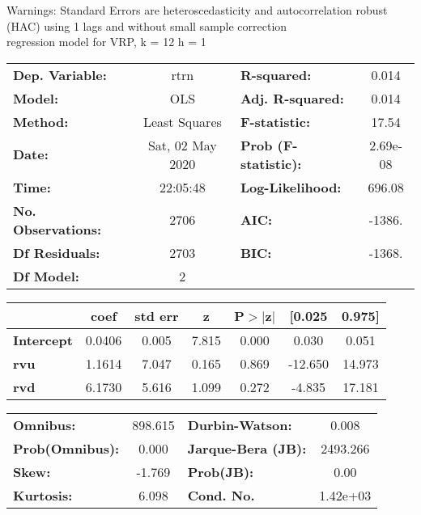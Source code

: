 Warnings: \newline
 [1] Standard Errors are heteroscedasticity and autocorrelation robust (HAC) using 1 lags and without small sample correction\\ 

regression model for VRP, k = 12 h = 1\begin{center}
\begin{tabular}{lclc}
\toprule
\textbf{Dep. Variable:}    &       rtrn       & \textbf{  R-squared:         } &     0.014   \\
\textbf{Model:}            &       OLS        & \textbf{  Adj. R-squared:    } &     0.014   \\
\textbf{Method:}           &  Least Squares   & \textbf{  F-statistic:       } &     17.54   \\
\textbf{Date:}             & Sat, 02 May 2020 & \textbf{  Prob (F-statistic):} &  2.69e-08   \\
\textbf{Time:}             &     22:05:48     & \textbf{  Log-Likelihood:    } &    696.08   \\
\textbf{No. Observations:} &        2706      & \textbf{  AIC:               } &    -1386.   \\
\textbf{Df Residuals:}     &        2703      & \textbf{  BIC:               } &    -1368.   \\
\textbf{Df Model:}         &           2      & \textbf{                     } &             \\
\bottomrule
\end{tabular}
\begin{tabular}{lcccccc}
                   & \textbf{coef} & \textbf{std err} & \textbf{z} & \textbf{P$> |$z$|$} & \textbf{[0.025} & \textbf{0.975]}  \\
\midrule
\textbf{Intercept} &       0.0406  &        0.005     &     7.815  &         0.000        &        0.030    &        0.051     \\
\textbf{rvu}       &       1.1614  &        7.047     &     0.165  &         0.869        &      -12.650    &       14.973     \\
\textbf{rvd}       &       6.1730  &        5.616     &     1.099  &         0.272        &       -4.835    &       17.181     \\
\bottomrule
\end{tabular}
\begin{tabular}{lclc}
\textbf{Omnibus:}       & 898.615 & \textbf{  Durbin-Watson:     } &    0.008  \\
\textbf{Prob(Omnibus):} &   0.000 & \textbf{  Jarque-Bera (JB):  } & 2493.266  \\
\textbf{Skew:}          &  -1.769 & \textbf{  Prob(JB):          } &     0.00  \\
\textbf{Kurtosis:}      &   6.098 & \textbf{  Cond. No.          } & 1.42e+03  \\
\bottomrule
\end{tabular}
\end{center}

